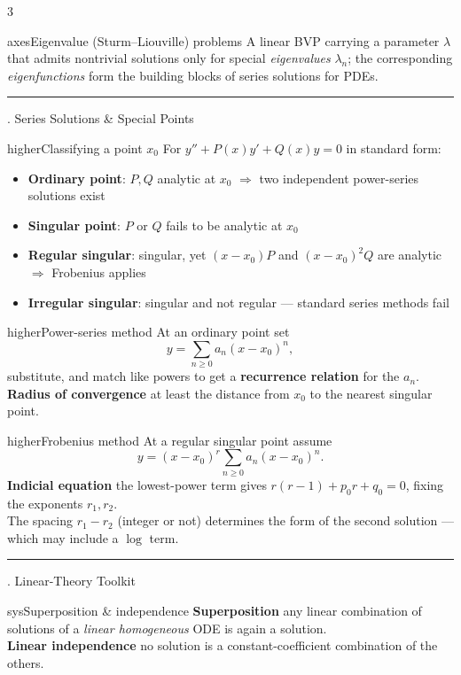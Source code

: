 \documentclass[10pt]{article}
\newcommand{\lab}[1]{\textcolor{ink}{\sffamily\footnotesize\textbf{#1}}\;}
\newcommand{\sect}[2]{%
  \begin{tcolorbox}[blanker, breakable, before skip=2pt, after skip=2pt]
  \begingroup\sffamily\bfseries\normalsize\color{#1}%
  {\color{#1}\rule[-1pt]{3pt}{12pt}}\;#2\endgroup
  \par\vspace{1pt}{\color{#1}\hrule height 1pt}
  \end{tcolorbox}}
\begin{document}
\begin{multicols}{3}
\begin{card}{axes}{Eigenvalue (Sturm--Liouville) problems}
A linear BVP carrying a parameter $\lambda$ that admits nontrivial solutions only for special \emph{eigenvalues} $\lambda_n$; the corresponding \emph{eigenfunctions} form the building blocks of series solutions for PDEs.
\end{card}

\columnbreak
\sect{higher}{7.\; Series Solutions \& Special Points}

\begin{card}{higher}{Classifying a point $x_0$}
For $y''+P(x)y'+Q(x)y=0$ in standard form:
\begin{itemize}
\item \textbf{Ordinary point}: $P,Q$ analytic at $x_0$ $\Rightarrow$ two independent power-series solutions exist
\item \textbf{Singular point}: $P$ or $Q$ fails to be analytic at $x_0$
\item \textbf{Regular singular}: singular, yet $(x{-}x_0)P$ and $(x{-}x_0)^2Q$ are analytic $\Rightarrow$ Frobenius applies
\item \textbf{Irregular singular}: singular and not regular --- standard series methods fail
\end{itemize}
\end{card}

\begin{card}{higher}{Power-series method}
At an ordinary point set
\[
y=\sum_{n\ge 0} a_n (x-x_0)^n,
\]
substitute, and match like powers to get a \textbf{recurrence relation} for the $a_n$.\\[2pt]
\lab{Radius of convergence} at least the distance from $x_0$ to the nearest singular point.
\end{card}

\begin{card}{higher}{Frobenius method}
At a regular singular point assume
\[
y=(x-x_0)^{r}\sum_{n\ge 0} a_n (x-x_0)^n .
\]
\lab{Indicial equation} the lowest-power term gives $r(r-1)+p_0 r+q_0=0$, fixing the exponents $r_1,r_2$.\\
The spacing $r_1-r_2$ (integer or not) determines the form of the second solution --- which may include a $\log$ term.
\end{card}

\sect{sys}{8.\; Linear-Theory Toolkit}

\begin{card}{sys}{Superposition \& independence}
\lab{Superposition} any linear combination of solutions of a \emph{linear homogeneous} ODE is again a solution.\\
\lab{Linear independence} no solution is a constant-coefficient combination of the others.
\end{card}


\end{multicols}
\end{document}
